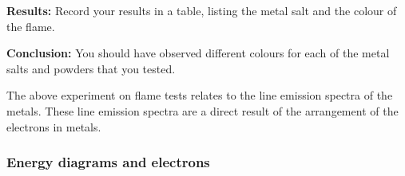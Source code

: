 \par 
\label{m38741*eip-6993}\noindent{}\textbf{Results:}\newline
    Record your results in a table, listing the metal salt and the colour of the flame.
\par 
\label{m38741*eip-6994}\noindent{}\textbf{Conclusion:}\newline
    You should have observed different colours for each of the metal salts and powders that you tested.\par \label{m38741*eip-378}The above experiment on flame tests relates to the line emission spectra of the metals. These line emission spectra are a direct result of the arrangement of the electrons in metals.\par \label{m38741*secfhsst!!!underscore!!!id766}
            \subsubsection{  Energy diagrams and electrons
        }
            \nopagebreak
